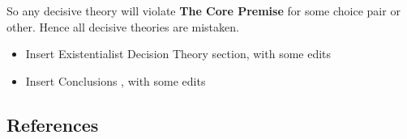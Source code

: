 \documentclass[
  12pt,
]{article}
\providecommand{\tightlist}{%
  \setlength{\itemsep}{0pt}\setlength{\parskip}{0pt}}
\begin{document}
So any decisive theory will violate \textbf{The Core Premise} for some
choice pair or other. Hence all decisive theories are mistaken.

\begin{itemize}
\tightlist
\item
  Insert Existentialist Decision Theory section, with some edits
\item
  Insert Conclusions , with some edits
\end{itemize}

\hypertarget{references}{%
\subsection*{References}\label{references}}

\hypertarget{refs}{}
\end{document}
